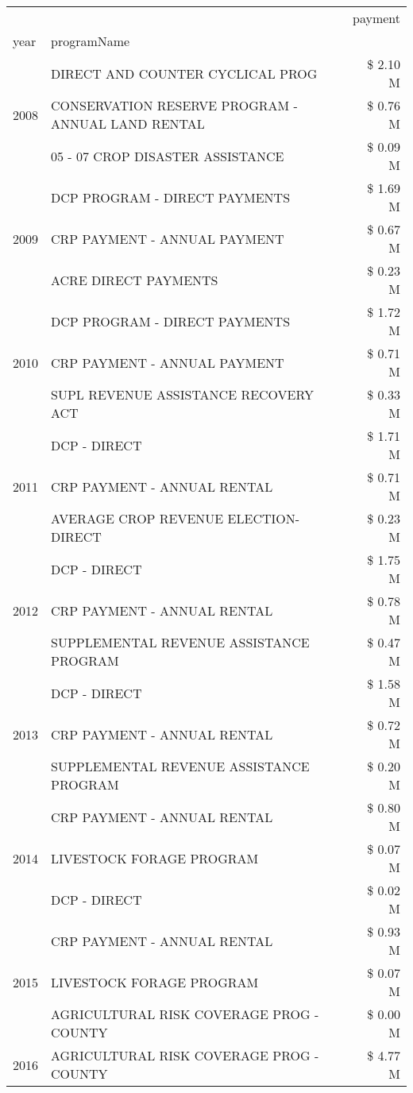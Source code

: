 \begin{tabular}{llr}
\toprule
 &  & payment \\
year & programName &  \\
\midrule
\multirow[t]{3}{*}{2008} & DIRECT AND COUNTER CYCLICAL PROG & \$ 2.10 M \\
 & CONSERVATION RESERVE PROGRAM - ANNUAL LAND RENTAL & \$ 0.76 M \\
 & 05 - 07 CROP DISASTER ASSISTANCE & \$ 0.09 M \\
\cline{1-3}
\multirow[t]{3}{*}{2009} & DCP PROGRAM - DIRECT PAYMENTS & \$ 1.69 M \\
 & CRP PAYMENT - ANNUAL PAYMENT & \$ 0.67 M \\
 & ACRE DIRECT PAYMENTS & \$ 0.23 M \\
\cline{1-3}
\multirow[t]{3}{*}{2010} & DCP PROGRAM - DIRECT PAYMENTS & \$ 1.72 M \\
 & CRP PAYMENT - ANNUAL PAYMENT & \$ 0.71 M \\
 & SUPL REVENUE ASSISTANCE RECOVERY ACT & \$ 0.33 M \\
\cline{1-3}
\multirow[t]{3}{*}{2011} & DCP - DIRECT & \$ 1.71 M \\
 & CRP PAYMENT - ANNUAL RENTAL & \$ 0.71 M \\
 & AVERAGE CROP REVENUE ELECTION-DIRECT & \$ 0.23 M \\
\cline{1-3}
\multirow[t]{3}{*}{2012} & DCP - DIRECT & \$ 1.75 M \\
 & CRP PAYMENT - ANNUAL RENTAL & \$ 0.78 M \\
 & SUPPLEMENTAL REVENUE ASSISTANCE PROGRAM & \$ 0.47 M \\
\cline{1-3}
\multirow[t]{3}{*}{2013} & DCP - DIRECT & \$ 1.58 M \\
 & CRP PAYMENT - ANNUAL RENTAL & \$ 0.72 M \\
 & SUPPLEMENTAL REVENUE ASSISTANCE PROGRAM & \$ 0.20 M \\
\cline{1-3}
\multirow[t]{3}{*}{2014} & CRP PAYMENT - ANNUAL RENTAL & \$ 0.80 M \\
 & LIVESTOCK FORAGE PROGRAM & \$ 0.07 M \\
 & DCP - DIRECT & \$ 0.02 M \\
\cline{1-3}
\multirow[t]{3}{*}{2015} & CRP PAYMENT - ANNUAL RENTAL & \$ 0.93 M \\
 & LIVESTOCK FORAGE PROGRAM & \$ 0.07 M \\
 & AGRICULTURAL RISK COVERAGE PROG - COUNTY & \$ 0.00 M \\
\cline{1-3}
\multirow[t]{3}{*}{2016} & AGRICULTURAL RISK COVERAGE PROG - COUNTY      & \$ 4.77 M \\

\end{tabular}
